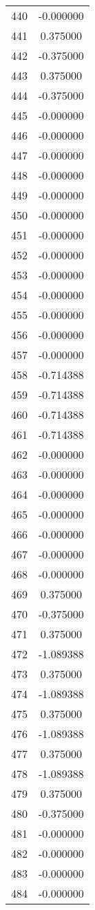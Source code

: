 \documentclass[12pt]{article}
\begin{document}
\begin{longtable}{@{}cc@{}}
440 & -0.000000 \\
441 & 0.375000 \\
442 & -0.375000 \\
443 & 0.375000 \\
444 & -0.375000 \\
445 & -0.000000 \\
446 & -0.000000 \\
447 & -0.000000 \\
448 & -0.000000 \\
449 & -0.000000 \\
450 & -0.000000 \\
451 & -0.000000 \\
452 & -0.000000 \\
453 & -0.000000 \\
454 & -0.000000 \\
455 & -0.000000 \\
456 & -0.000000 \\
457 & -0.000000 \\
458 & -0.714388 \\
459 & -0.714388 \\
460 & -0.714388 \\
461 & -0.714388 \\
462 & -0.000000 \\
463 & -0.000000 \\
464 & -0.000000 \\
465 & -0.000000 \\
466 & -0.000000 \\
467 & -0.000000 \\
468 & -0.000000 \\
469 & 0.375000 \\
470 & -0.375000 \\
471 & 0.375000 \\
472 & -1.089388 \\
473 & 0.375000 \\
474 & -1.089388 \\
475 & 0.375000 \\
476 & -1.089388 \\
477 & 0.375000 \\
478 & -1.089388 \\
479 & 0.375000 \\
480 & -0.375000 \\
481 & -0.000000 \\
482 & -0.000000 \\
483 & -0.000000 \\
484 & -0.000000 \\

\end{longtable}
\end{document}
